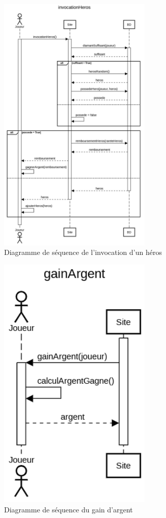     \newpage

    \begin{figure}[ht!]
        \centering
            \includegraphics[width=0.65\textwidth]{images/invocationHeros.png}
        \caption{Diagramme de séquence de l'invocation d'un héros}
    \end{figure}


    \begin{figure}[ht!]
        \centering
            \includegraphics[width=0.65\textwidth]{images/gainArgent.png}
        \caption{Diagramme de séquence du gain d'argent}
    \end{figure}


